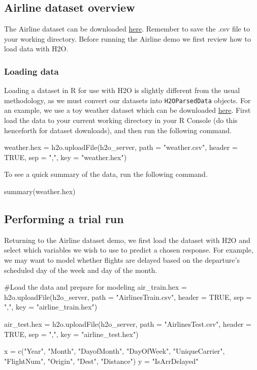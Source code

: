 \documentclass[11pt]{article}
\begin{document}
\subsection{Airline dataset overview} \label{3.1}

The Airline dataset can be downloaded \href{https://github.com/0xdata/h2o/blob/master/smalldata/airlines/allyears2k_headers.zip}{here}. Remember to save the .csv file to your working directory. Before running the Airline demo we first review how to load data with H2O. 

\subsubsection{Loading data} \label{2.5}

Loading a dataset in R for use with H2O is slightly different from the usual methodology, as we must convert our datasets into \texttt{H2OParsedData} objects. For an example, we use a toy weather dataset which can be downloaded \href{https://raw.githubusercontent.com/0xdata/h2o/master/smalldata/weather.csv}{here}. First load the data to your current working directory in your R Console (do this henceforth for dataset downloads), and then run the following command.
\begin{spverbatim}
weather.hex = h2o.uploadFile(h2o_server, path = "weather.csv", header = TRUE, sep = ",", key = "weather.hex")
\end{spverbatim}
\bigskip
\noindent
To see a quick summary of the data, run the following command.
\begin{spverbatim}
summary(weather.hex)
\end{spverbatim}


\subsection{Performing a trial run} \label{3.2}
Returning to the Airline dataset demo, we first load the dataset with H2O and select which variables we wish to use to predict a chosen response. For example, we may want to model whether flights are delayed based on the departure's scheduled day of the week and day of the month.
\begin{spverbatim}

#Load the data and prepare for modeling
air_train.hex = h2o.uploadFile(h2o_server, path = "AirlinesTrain.csv", header = TRUE, sep = ",", key = "airline_train.hex")

air_test.hex = h2o.uploadFile(h2o_server, path = "AirlinesTest.csv", header = TRUE, sep = ",", key = "airline_test.hex")

x = c("Year", "Month", "DayofMonth", "DayOfWeek", "UniqueCarrier", "FlightNum", "Origin", "Dest", "Distance")
y = "IsArrDelayed" 

\end{spverbatim}
\end{document}
